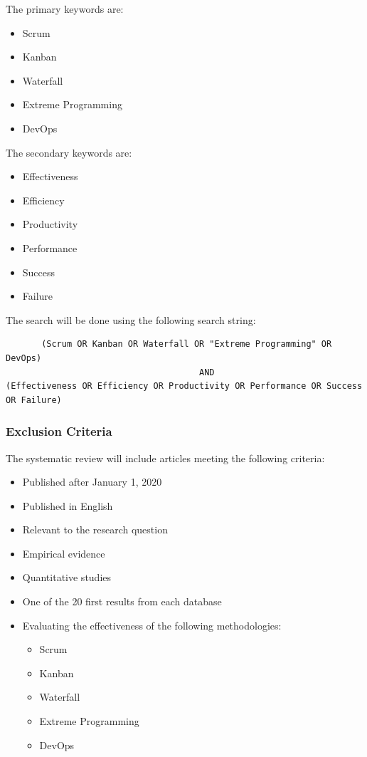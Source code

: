 \documentclass[12pt]{article}
\begin{document}
The primary keywords are:
\begin{itemize}
  \item Scrum
  \item Kanban
  \item Waterfall
  \item Extreme Programming
  \item DevOps
\end{itemize}
The secondary keywords are:
\begin{itemize}
  \item Effectiveness
  \item Efficiency
  \item Productivity
  \item Performance
  \item Success
  \item Failure
\end{itemize}
The search will be done using the following search string:

\begin{adjustwidth}{-4em}{0pt}
\begin{verbatim}
       (Scrum OR Kanban OR Waterfall OR "Extreme Programming" OR DevOps) 
                                      AND
(Effectiveness OR Efficiency OR Productivity OR Performance OR Success OR Failure)
\end{verbatim}
\end{adjustwidth}

\subsubsection{Exclusion Criteria}
The systematic review will include articles meeting the following criteria:
\begin{itemize}
  \item Published after January 1, 2020
  \item Published in English
  \item Relevant to the research question
  \item Empirical evidence
  \item Quantitative studies
  \item One of the 20 first results from each database
  \item Evaluating the effectiveness of the following methodologies:
  \begin{itemize}
    \item Scrum
    \item Kanban
    \item Waterfall
    \item Extreme Programming
    \item DevOps
  \end{itemize}
\end{itemize}
\end{document}

